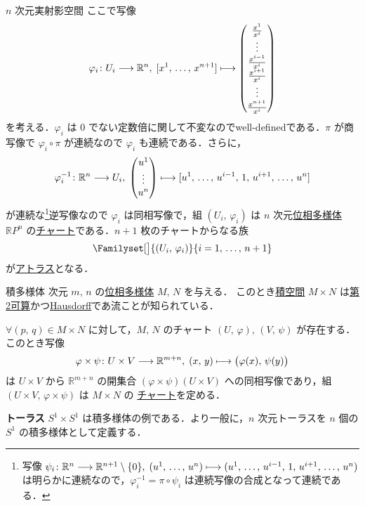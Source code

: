 \documentclass[geometry_main]{subfiles}
\begin{document}
\begin{myexample}[label=ex:topomani-projective]{$n$ 次元実射影空間}
	ここで写像
	\begin{align}
		\varphi_i \colon U_i \lto \mathbb{R}^n,\; [x^1,\, \dots,\, x^{n+1}] \lmto \mqty( \frac{x^1}{x^i} \\ \vdots \\ \frac{x^{i-1}}{x^i} \\ \frac{x^{i+1}}{x^i} \\ \vdots \\ \frac{x^{n+1}}{x^i} ) 
	\end{align}
	を考える．$\varphi_i$ は $0$ でない定数倍に関して不変なのでwell-definedである．$\pi$ が商写像で $\varphi_i \circ \pi$ が連続なので $\varphi_i$ も連続である．さらに，
	\begin{align}
		\varphi_i^{-1}\colon \mathbb{R}^n \lto U_i,\; \mqty(u^1 \\ \vdots \\ u^n) \lmto [u^1,\, \dots,\, u^{i-1},\, 1,\, u^{i+1},\, \dots,\, u^n]
	\end{align}
	が連続な\footnote{写像 $\psi_i \colon \mathbb{R}^n \longrightarrow \mathbb{R}^{n+1} \setminus \{0\},\; (u^1,\, \dots,\, u^n) \longmapsto (u^1,\, \dots,\, u^{i-1},\, 1,\, u^{i+1},\, \dots,\, u^n)$ は明らかに連続なので，$\varphi_i^{-1} = \pi \circ \psi_i$ は連続写像の合成となって連続である．}逆写像なので $\varphi_i$ は同相写像で，組 $(U_i,\, \varphi_i)$ は $n$ 次元\hyperref[def.topomani]{位相多様体} $\mathbb{R}P^n$ の\hyperref[def.localcoord]{チャート}である．$n+1$ 枚のチャートからなる族
	\begin{align}
		\Familyset[\big]{(U_i,\, \varphi_i)}{i = 1,\, \dots,\, n+1}
	\end{align}
	が\hyperref[def.atlas]{アトラス}となる．
\end{myexample}

\begin{myexample}[label=ex:product-mani]{積多様体}
	次元 $m,\, n$ の\hyperref[def.topomani]{位相多様体} $M,\, N$ を与える．
	このとき\hyperref[def.prodtopo]{積空間} $M \times N$ は\hyperref[def:second-countable]{第2可算}かつ\hyperref[def.separation]{Hausdorff}であ流ことが知られている．

	$\forall (p,\, q) \in M \times N$ に対して，$M,\, N$ のチャート $(U,\, \varphi),\, (V,\, \psi)$ が存在する．
	このとき写像
	\begin{align}
		\varphi \times \psi \colon U \times V \longrightarrow \mathbb{R}^{m+n},\; (x,\, y) \longmapsto \bigl( \varphi(x),\, \psi(y) \bigr) 
	\end{align}
	は $U \times V$ から $\mathbb{R}^{m+n}$ の開集合 $(\varphi \times \psi) (U\times V)$ への同相写像であり，組 $(U\times V,\, \varphi \times \psi)$ は $M \times N$ の
	\hyperref[def.localcoord]{チャート}を定める．

	\textbf{トーラス} $S^1 \times S^1$ は積多様体の例である．より一般に，$n$ 次元トーラスを $n$ 個の $S^1$ の積多様体として定義する．
\end{myexample}
\end{document}
